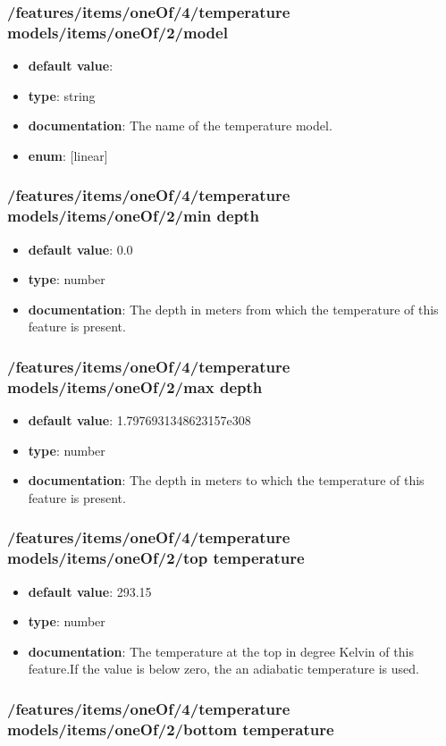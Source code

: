 \subsubsection{/features/items/oneOf/4/temperature models/items/oneOf/2/model}
\begin{itemize}\item {\bf default value}: 
\item {\bf type}: string
\item {\bf documentation}: The name of the temperature model.
\item {\bf enum}: [linear]\end{itemize}\subsubsection{/features/items/oneOf/4/temperature models/items/oneOf/2/min depth}
\begin{itemize}\item {\bf default value}: 0.0
\item {\bf type}: number
\item {\bf documentation}: The depth in meters from which the temperature of this feature is present.
\end{itemize}\subsubsection{/features/items/oneOf/4/temperature models/items/oneOf/2/max depth}
\begin{itemize}\item {\bf default value}: 1.7976931348623157e308
\item {\bf type}: number
\item {\bf documentation}: The depth in meters to which the temperature of this feature is present.
\end{itemize}\subsubsection{/features/items/oneOf/4/temperature models/items/oneOf/2/top temperature}
\begin{itemize}\item {\bf default value}: 293.15
\item {\bf type}: number
\item {\bf documentation}: The temperature at the top in degree Kelvin of this feature.If the value is below zero, the an adiabatic temperature is used.
\end{itemize}\subsubsection{/features/items/oneOf/4/temperature models/items/oneOf/2/bottom temperature}

